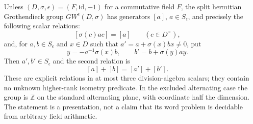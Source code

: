 \begin{theorem}
\label{C:hermitian_scalar_presentation}
Unless $(D,\sigma,\epsilon)=(F,\mathrm{id},-1)$ for a commutative
field $F$, the split hermitian Grothendieck group
$GW^\epsilon(D,\sigma)$ has generators $[a]$, $a\in S_\epsilon$,
and precisely the following scalar relations:
\[
 [\sigma(c)ac]=[a]\qquad(c\in D^\times),                \tag{C.3.HS1}
\]
and, for $a,b\in S_\epsilon$ and $x\in D$ such that
$a'=a+\sigma(x)bx\ne0$, put
\[
 y=-a^{-1}\sigma(x)b,\qquad b'=b+\sigma(y)ay.
\]
Then $a',b'\in S_\epsilon$ and the second relation is
\[
                    [a]+[b]=[a']+[b'].                 \tag{C.3.HS2}
\]
These are explicit relations in at most three division-algebra
scalars; they contain no unknown higher-rank isometry predicate.
In the excluded alternating case the group is $\mathbb Z$ on
the standard alternating plane, with coordinate half the dimension.
The statement is a presentation, not a claim that its word problem
is decidable from arbitrary field arithmetic.
\end{theorem}
